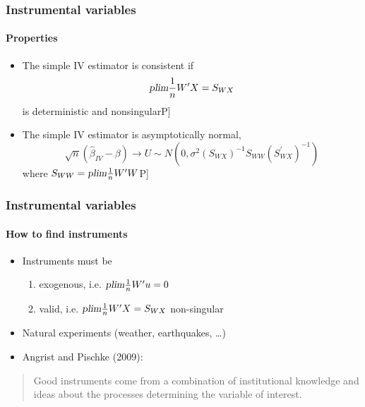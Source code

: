 \documentclass[notes=show]{beamer}
\begin{document}
\begin{frame}\frametitle{Instrumental variables}\framesubtitle{Properties}
\begin{itemize}
    \item The simple IV estimator is consistent if
    \begin{equation*}
        \textsl{plim}\frac{1}{n}W^{\prime }X=S_{WX}
    \end{equation*}
    is deterministic and nonsingular\hfill \lbrack P]
    \item The simple IV estimator is asymptotically normal,
    \begin{equation*}
        \sqrt{n}\left( \hat{\beta}_{IV}-\beta \right) \rightarrow U\sim N\left(0,\sigma ^{2}\left( S_{WX}\right) ^{-1}S_{WW}\left( S_{WX}^{\prime }\right)^{-1}\right)
    \end{equation*}
    where $S_{WW}=\textsl{plim}\frac{1}{n}W^{\prime }W$\hfill \lbrack P]
\end{itemize}
\end{frame}


\begin{frame}\frametitle{Instrumental variables}\framesubtitle{How to find instruments}
\begin{itemize}
    \item Instruments must be
    \begin{enumerate}
        \item exogenous, i.e. $\textsl{plim}\frac{1}{n}W^{\prime }u=0$
        \item valid, i.e. $\textsl{plim}\frac{1}{n}W^{\prime }X=S_{WX}$ non-singular
    \end{enumerate}
    \item Natural experiments (weather, earthquakes, \ldots )
    \item Angrist and Pischke (2009):
\end{itemize}
\begin{quotation}
    Good instruments come from a combination of institutional knowledge and ideas about the processes determining the variable of interest.
\end{quotation}
\end{frame}
\end{document}
